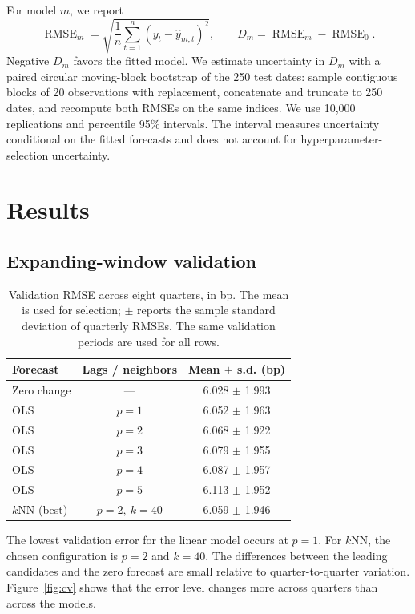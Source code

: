 \documentclass[10pt,letterpaper]{article}
\newcommand{\RMSE}{\operatorname{RMSE}}
\begin{document}
For model $m$, we report
\begin{equation}
\RMSE_m=\sqrt{\frac1n\sum_{t=1}^n(y_t-\widehat y_{m,t})^2},\qquad
D_m=\RMSE_m-\RMSE_0.
\label{eq:delta}
\end{equation}
Negative $D_m$ favors the fitted model. We estimate uncertainty in $D_m$ with a paired circular moving-block bootstrap of the 250 test dates: sample contiguous blocks of 20 observations with replacement, concatenate and truncate to 250 dates, and recompute both RMSEs on the same indices. We use 10,000 replications and percentile 95\% intervals. The interval measures uncertainty conditional on the fitted forecasts and does not account for hyperparameter-selection uncertainty.

\section{Results}
\subsection{Expanding-window validation}
\begin{table}[H]
\centering
\caption{Validation RMSE across eight quarters, in bp. The mean is used for selection; $\pm$ reports the sample standard deviation of quarterly RMSEs. The same validation periods are used for all rows.}
\label{tab:cv}
\begin{tabular}{lcc}
\toprule
Forecast & Lags / neighbors & Mean $\pm$ s.d. (bp)\\
\midrule
Zero change & --- & 6.028 $\pm$ 1.993\\
OLS & $p=1$ & 6.052 $\pm$ 1.963\\
OLS & $p=2$ & 6.068 $\pm$ 1.922\\
OLS & $p=3$ & 6.079 $\pm$ 1.955\\
OLS & $p=4$ & 6.087 $\pm$ 1.957\\
OLS & $p=5$ & 6.113 $\pm$ 1.952\\
$k$NN (best) & $p=2,\ k=40$ & 6.059 $\pm$ 1.946\\
\bottomrule
\end{tabular}
\end{table}

The lowest validation error for the linear model occurs at $p=1$. For $k$NN, the chosen configuration is $p=2$ and $k=40$. The differences between the leading candidates and the zero forecast are small relative to quarter-to-quarter variation. Figure~\ref{fig:cv} shows that the error level changes more across quarters than across the models.
\end{document}
